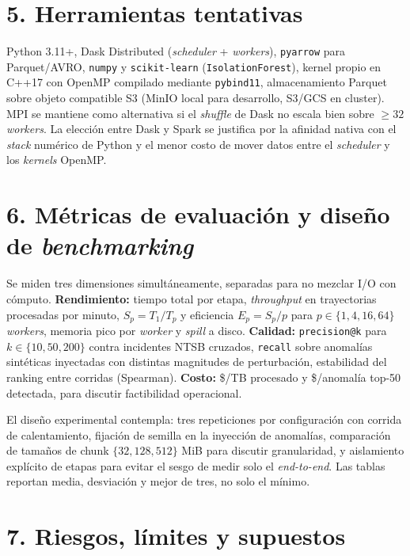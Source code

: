 \documentclass[letterpaper,11pt]{article}
\begin{document}
\section*{5. Herramientas tentativas}

Python 3.11+, Dask Distributed (\textit{scheduler} + \textit{workers}), \texttt{pyarrow} para Parquet/AVRO, \texttt{numpy} y \texttt{scikit-learn} (\texttt{IsolationForest}), kernel propio en C++17 con OpenMP compilado mediante \texttt{pybind11}, almacenamiento Parquet sobre objeto compatible S3 (MinIO local para desarrollo, S3/GCS en cluster). MPI se mantiene como alternativa si el \textit{shuffle} de Dask no escala bien sobre $\geq 32$ \textit{workers}. La elección entre Dask y Spark se justifica por la afinidad nativa con el \textit{stack} numérico de Python y el menor costo de mover datos entre el \textit{scheduler} y los \textit{kernels} OpenMP.

\section*{6. Métricas de evaluación y diseño de \textit{benchmarking}}

Se miden tres dimensiones simultáneamente, separadas para no mezclar I/O con cómputo. \textbf{Rendimiento:} tiempo total por etapa, \textit{throughput} en trayectorias procesadas por minuto, $S_p = T_1/T_p$ y eficiencia $E_p = S_p/p$ para $p \in \{1, 4, 16, 64\}$ \textit{workers}, memoria pico por \textit{worker} y \textit{spill} a disco. \textbf{Calidad:} \texttt{precision@k} para $k \in \{10, 50, 200\}$ contra incidentes NTSB cruzados, \texttt{recall} sobre anomalías sintéticas inyectadas con distintas magnitudes de perturbación, estabilidad del ranking entre corridas (Spearman). \textbf{Costo:} \$/TB procesado y \$/anomalía top-50 detectada, para discutir factibilidad operacional.

El diseño experimental contempla: tres repeticiones por configuración con corrida de calentamiento, fijación de semilla en la inyección de anomalías, comparación de tamaños de chunk $\{32, 128, 512\}$ MiB para discutir granularidad, y aislamiento explícito de etapas para evitar el sesgo de medir solo el \textit{end-to-end}. Las tablas reportan media, desviación y mejor de tres, no solo el mínimo.

\section*{7. Riesgos, límites y supuestos}
\end{document}
